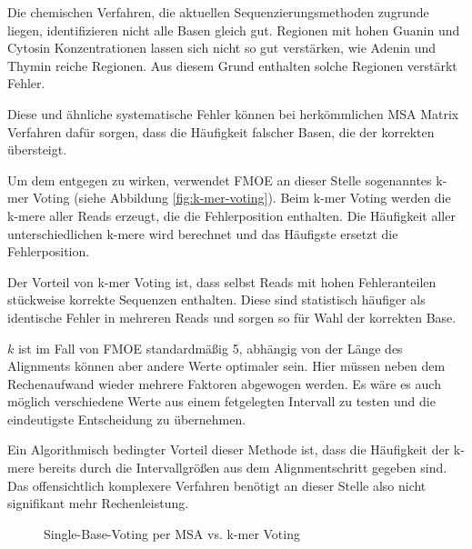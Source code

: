 Die chemischen Verfahren, die aktuellen Sequenzierungsmethoden zugrunde liegen, identifizieren nicht alle Basen gleich gut.
Regionen mit hohen Guanin und Cytosin Konzentrationen lassen sich nicht so gut verstärken, wie Adenin und Thymin reiche Regionen.
Aus diesem Grund enthalten solche Regionen verstärkt Fehler.

Diese und ähnliche systematische Fehler können bei herkömmlichen MSA Matrix Verfahren dafür sorgen, dass die Häufigkeit falscher Basen, die der korrekten übersteigt.

Um dem entgegen zu wirken, verwendet FMOE an dieser Stelle sogenanntes k-mer Voting (siehe Abbildung \ref{fig:k-mer-voting}).
Beim k-mer Voting werden die k-mere aller Reads erzeugt, die die Fehlerposition enthalten. Die Häufigkeit aller unterschiedlichen k-mere wird berechnet und das Häufigste ersetzt die Fehlerposition.

Der Vorteil von k-mer Voting ist, dass selbst Reads mit hohen Fehleranteilen stückweise korrekte Sequenzen enthalten.
Diese sind statistisch häufiger als identische Fehler in mehreren Reads und sorgen so für Wahl der korrekten Base.

$k$ ist im Fall von FMOE standardmäßig 5, abhängig von der Länge des Alignments können aber andere Werte optimaler sein.
Hier müssen neben dem Rechenaufwand wieder mehrere Faktoren abgewogen werden.
Es wäre es auch möglich verschiedene Werte aus einem fetgelegten Intervall zu testen und die eindeutigste Entscheidung zu übernehmen.

Ein Algorithmisch bedingter Vorteil dieser Methode ist, dass die Häufigkeit der k-mere bereits durch die Intervallgrößen aus dem Alignmentschritt gegeben sind.
Das offensichtlich komplexere Verfahren benötigt an dieser Stelle also nicht signifikant mehr Rechenleistung.

\begin{figure}[h]
	\begin{center}
	\end{center}
	\caption{Single-Base-Voting per MSA vs. k-mer Voting}
	\label{fig:correction-voting}
\end{figure}

